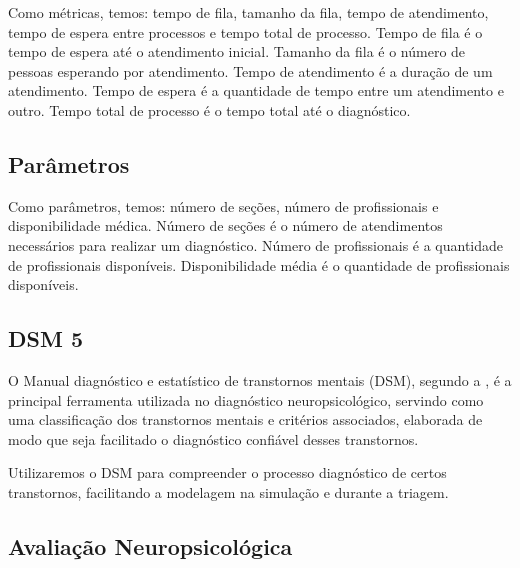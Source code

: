 \documentclass[
    12pt,
    openright,
    oneside,
    a4paper,
    english,
    brazil
]{abntex2}
\begin{document}
Como métricas, temos: tempo de fila, tamanho da fila, tempo de atendimento, tempo de espera entre processos e tempo total de processo. Tempo de fila é o tempo de espera até o atendimento inicial. Tamanho da fila é o número de pessoas esperando por atendimento. Tempo de atendimento é a duração de um atendimento. Tempo de espera é a quantidade de tempo entre um atendimento e outro. Tempo total de processo é o tempo total até o diagnóstico. 

\subsection{Parâmetros}

Como parâmetros, temos: número de seções, número de profissionais e disponibilidade médica. Número de seções é o número de atendimentos necessários para realizar um diagnóstico. Número de profissionais é a quantidade de profissionais disponíveis. Disponibilidade média é o quantidade de profissionais disponíveis.

\subsection{DSM 5}

O Manual diagnóstico e estatístico de transtornos mentais (DSM), segundo a , é a principal ferramenta utilizada no diagnóstico neuropsicológico, servindo como uma classificação dos transtornos mentais e critérios associados, elaborada de modo que seja facilitado o diagnóstico confiável desses transtornos.

Utilizaremos o DSM para compreender o processo diagnóstico de certos transtornos, facilitando a modelagem na simulação e durante a triagem.

\subsection{Avaliação Neuropsicológica}
\end{document}
